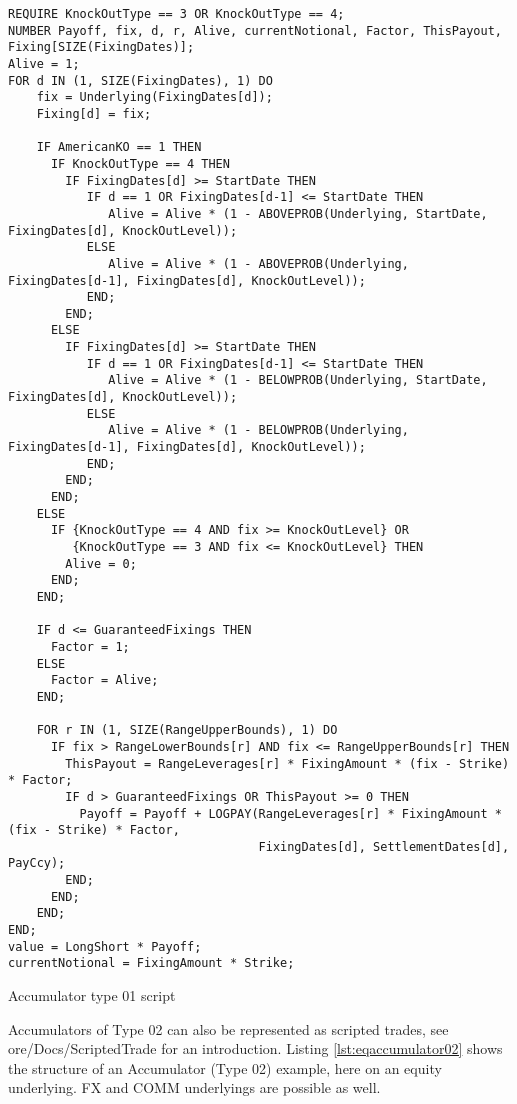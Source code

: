 \begin{listing}[H]
\begin{verbatim}
REQUIRE KnockOutType == 3 OR KnockOutType == 4;
NUMBER Payoff, fix, d, r, Alive, currentNotional, Factor, ThisPayout, Fixing[SIZE(FixingDates)];
Alive = 1;
FOR d IN (1, SIZE(FixingDates), 1) DO
    fix = Underlying(FixingDates[d]);
    Fixing[d] = fix;

    IF AmericanKO == 1 THEN
      IF KnockOutType == 4 THEN
        IF FixingDates[d] >= StartDate THEN
           IF d == 1 OR FixingDates[d-1] <= StartDate THEN
              Alive = Alive * (1 - ABOVEPROB(Underlying, StartDate, FixingDates[d], KnockOutLevel));
           ELSE
              Alive = Alive * (1 - ABOVEPROB(Underlying, FixingDates[d-1], FixingDates[d], KnockOutLevel));
           END;
        END;
      ELSE
        IF FixingDates[d] >= StartDate THEN
           IF d == 1 OR FixingDates[d-1] <= StartDate THEN
              Alive = Alive * (1 - BELOWPROB(Underlying, StartDate, FixingDates[d], KnockOutLevel));
           ELSE
              Alive = Alive * (1 - BELOWPROB(Underlying, FixingDates[d-1], FixingDates[d], KnockOutLevel));
           END;
        END;
      END;
    ELSE
      IF {KnockOutType == 4 AND fix >= KnockOutLevel} OR
         {KnockOutType == 3 AND fix <= KnockOutLevel} THEN
        Alive = 0;
      END;
    END;

    IF d <= GuaranteedFixings THEN
      Factor = 1;
    ELSE
      Factor = Alive;
    END;

    FOR r IN (1, SIZE(RangeUpperBounds), 1) DO
      IF fix > RangeLowerBounds[r] AND fix <= RangeUpperBounds[r] THEN
        ThisPayout = RangeLeverages[r] * FixingAmount * (fix - Strike) * Factor;
        IF d > GuaranteedFixings OR ThisPayout >= 0 THEN
          Payoff = Payoff + LOGPAY(RangeLeverages[r] * FixingAmount * (fix - Strike) * Factor,
                                   FixingDates[d], SettlementDates[d], PayCcy);
        END;
      END;
    END;
END;
value = LongShort * Payoff;
currentNotional = FixingAmount * Strike;
\end{verbatim}
\caption{Accumulator type 01 script}
\label{lst:accumulator01_script}
\end{listing}


Accumulators of Type 02 can also be represented as scripted trades, see ore/Docs/ScriptedTrade for an
introduction.  Listing \ref{lst:eqaccumulator02} shows the structure of an Accumulator (Type 02) example, here on an
equity underlying. FX and COMM underlyings are possible as well.

